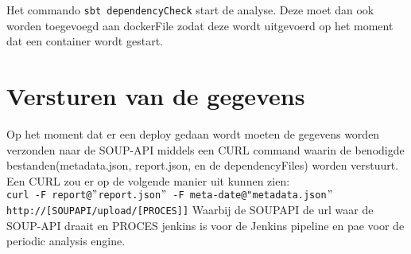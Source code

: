 Het commando \texttt{sbt dependencyCheck} start de analyse. Deze moet dan ook worden toegevoegd aan dockerFile zodat deze wordt uitgevoerd op het moment dat een container wordt gestart.


\section{Versturen van de gegevens}
Op het moment dat er een deploy gedaan wordt moeten de gegevens worden verzonden naar de SOUP-API middels een CURL command waarin de benodigde bestanden(metadata.json, report.json, en de dependencyFiles) worden verstuurt. Een CURL zou er op de volgende manier uit kunnen zien: \\ \texttt{curl -F report@$"$report.json$"$ -F meta-date@"metadata.json$"$ http://[SOUPAPI/upload/[PROCES]]}
Waarbij de SOUPAPI de url waar de SOUP-API draait en PROCES jenkins is voor de Jenkins pipeline en pae voor de periodic analysis engine.



